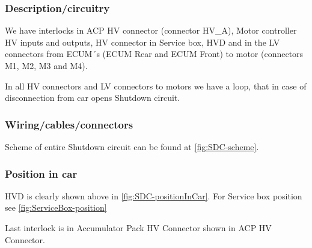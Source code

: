 \subsubsection{Description/circuitry}
\iffalse Describe the concept and circuitry of the Shutdown System Interlocks.
Note: Interlocks are circuits used to open the shutdown circuit if a connector is disconnected or enclosure is opened.  This is not the entire shutdown circuit.\fi

We have interlocks in ACP HV connector (connector HV\_A), Motor controller HV inputs and outputs, HV connector in Service box, HVD and in the LV connectors from ECUM´s (ECUM Rear and ECUM Front) to motor (connectors M1, M2, M3 and M4). 

In all HV connectors and LV connectors to motors we have a loop, that in case of disconnection from car opens Shutdown circuit.

\subsubsection{Wiring/cables/connectors}

Scheme of entire Shutdown circuit can be found at \ref{fig:SDC-scheme}.

\subsubsection{Position in car}
HVD is clearly shown above in \ref{fig:SDC-positionInCar}. For Service box position see \ref{fig:ServiceBox-position}

Last interlock is in Accumulator Pack HV Connector shown in ACP HV Connector.